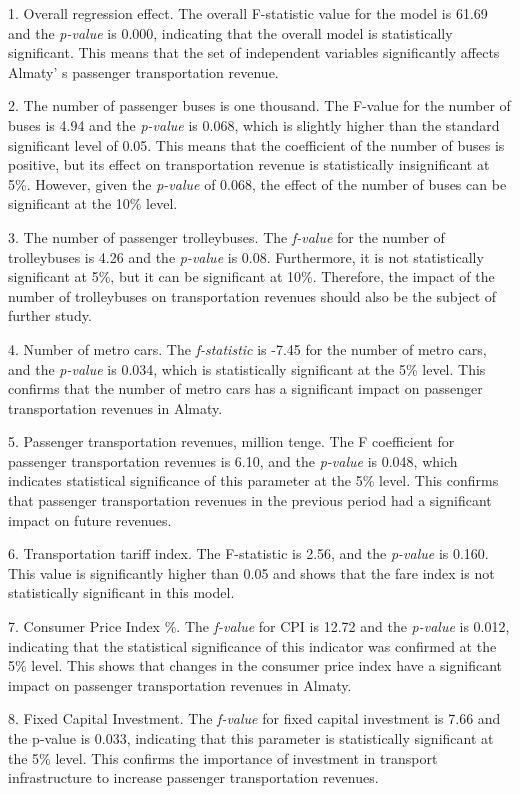 1. Overall regression effect. The overall F-statistic value for the
model is 61.69 and the \emph{p-value} is 0.000, indicating that the
overall model is statistically significant. This means that the set of
independent variables significantly affects Almaty' s
passenger transportation revenue.

2. The number of passenger buses is one thousand. The F-value for the
number of buses is 4.94 and the \emph{p-value} is 0.068, which is
slightly higher than the standard significant level of 0.05. This means
that the coefficient of the number of buses is positive, but its effect
on transportation revenue is statistically insignificant at 5\%.
However, given the \emph{p-value} of 0.068, the effect of the number of
buses can be significant at the 10\% level.

3. The number of passenger trolleybuses. The \emph{f-value} for the
number of trolleybuses is 4.26 and the \emph{p-value} is 0.08.
Furthermore, it is not statistically significant at 5\%, but it can be
significant at 10\%. Therefore, the impact of the number of trolleybuses
on transportation revenues should also be the subject of further study.

4. Number of metro cars. The \emph{f-statistic} is -7.45 for the number
of metro cars, and the \emph{p-value} is 0.034, which is statistically
significant at the 5\% level. This confirms that the number of metro
cars has a significant impact on passenger transportation revenues in
Almaty.

5. Passenger transportation revenues, million tenge. The F coefficient
for passenger transportation revenues is 6.10, and the \emph{p-value} is
0.048, which indicates statistical significance of this parameter at the
5\% level. This confirms that passenger transportation revenues in the
previous period had a significant impact on future revenues.

6. Transportation tariff index. The F-statistic is 2.56, and the
\emph{p-value} is 0.160. This value is significantly higher than 0.05
and shows that the fare index is not statistically significant in this
model.

7. Consumer Price Index \%. The \emph{f-value} for CPI is 12.72 and the
\emph{p-value} is 0.012, indicating that the statistical significance of
this indicator was confirmed at the 5\% level. This shows that changes
in the consumer price index have a significant impact on passenger
transportation revenues in Almaty.

8. Fixed Capital Investment. The \emph{f-value} for fixed capital
investment is 7.66 and the p-value is 0.033, indicating that this
parameter is statistically significant at the 5\% level. This confirms
the importance of investment in transport infrastructure to increase
passenger transportation revenues.


